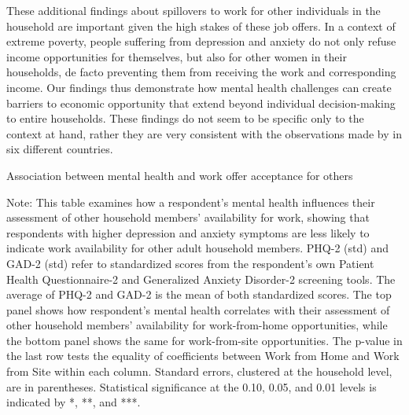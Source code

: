 \documentclass[12pt, a4paper, american]{article}
\begin{document}
These additional findings about spillovers to work for other individuals in the household are important given the high stakes of these job offers. In a context of extreme poverty, people suffering from depression and anxiety do not only refuse income opportunities for themselves, but also for other women in their households, de facto preventing them from receiving the work and corresponding income. Our findings thus demonstrate how mental health challenges can create barriers to economic opportunity that extend beyond individual decision-making to entire households. These findings do not seem to be specific only to the context at hand, rather they are very consistent with the observations made by \citet{Lund_2019} in six different countries. 

\begin{table}[H]\caption{Association between mental health and work offer acceptance for others}\label{cor_mh_signup_others}
\centering
\begin{threeparttable}

\begin{tablenotes}
\item Note: This table examines how a respondent's mental health influences their assessment of other household members' availability for work, showing that respondents with higher depression and anxiety symptoms are less likely to indicate work availability for other adult household members. PHQ-2 (std) and GAD-2 (std) refer to standardized scores from the respondent's own Patient Health Questionnaire-2 and Generalized Anxiety Disorder-2 screening tools. The average of PHQ-2 and GAD-2 is the mean of both standardized scores. The top panel shows how respondent's mental health correlates with their assessment of other household members' availability for work-from-home opportunities, while the bottom panel shows the same for work-from-site opportunities. The p-value in the last row tests the equality of coefficients between Work from Home and Work from Site  within each column. Standard errors, clustered at the household level, are in parentheses. Statistical significance at the 0.10, 0.05, and 0.01 levels is indicated by *, **, and ***.
\end{tablenotes}
\end{threeparttable}
\end{table}
\end{document}

